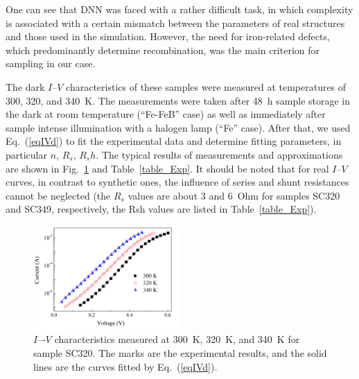 \documentclass[num-refs]{wiley-article} %
\begin{document}
One can see that DNN was faced with a rather difficult task,
in which complexity is associated with a certain mismatch between the parameters of real structures and those used in the simulation.
However, the need for iron-related defects, which predominantly determine recombination, was the main criterion for sampling in our case.

The dark $I$--$V$ characteristics of these samples were measured at temperatures
of 300, 320, and 340~K.
The measurements were taken after 48~h sample storage in the dark at room temperature
(``Fe-FeB'' case)
as well as immediately after sample intense illumination with a halogen lamp
(``Fe'' case).
After that, we used Eq.~(\ref{eqIVd}) to fit the experimental data and determine fitting parameters, in particular $n$, $R_s$, $R_sh$.
The typical results of measurements and approximations are shown in Fig.~\ref{fig_IVexp}
and Table~\ref{table_Exp}.
It should be noted that for real $I$--$V$ curves, in contrast to synthetic ones,
the influence of series and shunt resistances cannot be neglected
(the $R_s$ values are about 3 and 6~Ohm for samples SC320 and SC349, respectively,
the Rsh values are listed in Table~\ref{table_Exp}).

\begin{figure}[t]
\centering
\includegraphics[width=0.5\textwidth]{F9}
\caption{
$I$–-$V$ characteristics measured at 300~K, 320~K, and 340~K for
sample SC320.
The marks are the experimental results, and
the solid lines are the curves fitted by
Eq.~(\ref{eqIVd}).
}
\label{fig_IVexp}
\end{figure}
\end{document}
